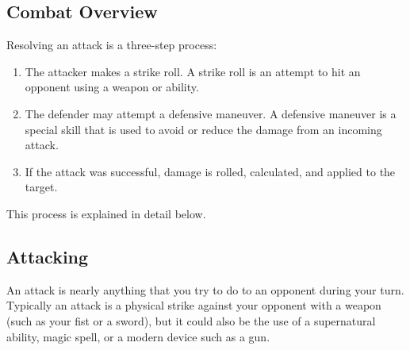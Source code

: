 \documentclass[twoside]{book}
\begin{document}
    

\subsection{Combat Overview}
    
    {  
    Resolving an attack is a three-step process: 
    }
  
\begin{enumerate}
      
  \item   
                  
    {  
    The attacker makes a strike roll. A strike roll
                   is an attempt to hit an opponent using a weapon or
                   ability. 
    }
  
              
  \item   
                  
    {  
    The defender may attempt a defensive maneuver. A
                   defensive maneuver is a special skill that is used to
                   avoid or reduce the damage from an incoming attack.
                   
    }
  
              
  \item   
                  
    {  
    If the attack was successful, damage is rolled,
                   calculated, and applied to the target. 
    }
  
              
\end{enumerate}
  
    {  
    This process is explained in detail below. 
    }
  
    

\subsection{Attacking}
    
    {  
    An attack is nearly anything that you try to do to
               an opponent during your turn. Typically an attack is a
               physical strike against your opponent with a weapon (such
               as your fist or a sword), but it could also be the use of
               a supernatural ability, magic spell, or a modern device
               such as a gun. 
    }
  
\end{document}
